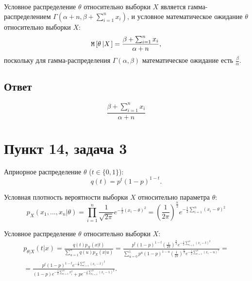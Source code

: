 Условное распределение $\theta$ относительно выборки $X$ является гамма-распределением $\Gamma \left ( \alpha + n, \beta + \sum_{i=1}^n x_i \right )$, и условное математическое
ожидание $\theta$ относительно выборки $X$:
\begin{equation}
    \mathtt{M} \left [  \theta \left | X \right . \right ] = \frac{\beta + \sum_{i=1}^n x_i}{\alpha + n} ,
\end{equation}
поскольку для гамма-распределения $\Gamma(\alpha, \beta)$ математическое ожидание есть $\frac{\beta}{\alpha}$.

\subsection*{Ответ}
\begin{equation}
    \frac{\beta + \sum_{i=1}^n x_i}{\alpha + n}
\end{equation}

\section*{Пункт 14, задача 3}

Априорное распределение $\theta$ ($t \in \{0, 1\}$):
\begin{equation}
    q(t) =  p^t (1-p)^{1-t}.
\end{equation}

Условная плотность вероятности выборки $X$ относительно параметра $\theta$:
\begin{equation}
    p_X(x_1, \dots, x_n | \theta)
    = \prod_{i=1}^n \frac{1}{\sqrt{2 \pi}} e^{-\frac{1}{2} (x_i - \theta)^2}
    = \left ( \frac{1}{2 \pi} \right )^\frac{n}{2} e^{-\frac{1}{2} \sum_{i=1}^n( x_i - \theta)^2}
\end{equation}

Условное распределение $\theta$ относительно выборки $X$:
\begin{multline}
    p_{\theta|X}(t|x)
    = \frac{q(t) p_X(x|t)}{\sum_{u=1}^n q(u) p_X(x|u)}
    =
    \frac{p^t (1-p)^{1-t} \left ( \frac{1}{2 \pi} \right )^\frac{n}{2} e^{-\frac{1}{2} \sum_{i=1}^n( x_i - t)^2}}{\sum_{u=0}^1 p^u (1-p)^{1-u} \left ( \frac{1}{2 \pi} \right )^\frac{n}{2} e^{-\frac{1}{2} \sum_{i=1}^n( x_i - u)^2}} = \\
    = \frac{p^t (1-p)^{1-t} e^{-\frac{1}{2} \sum_{i=1}^n( x_i - t)^2}}{(1-p) e^{-\frac{1}{2} \sum_{i=1}^n x_i^2} + p e^{-\frac{1}{2} \sum_{i=1}^n (x_i - 1)^2}} .
\end{multline}


